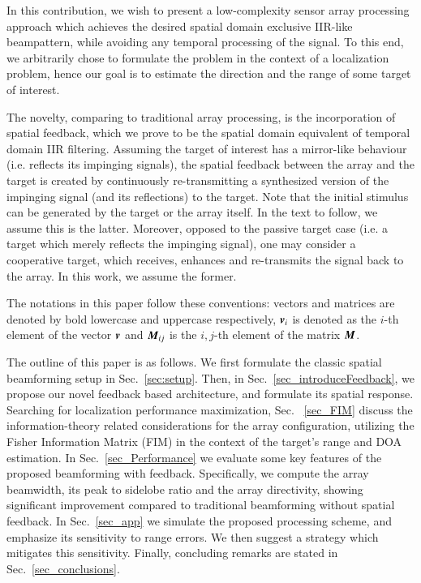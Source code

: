 \par In this contribution, we wish to present a low-complexity sensor array processing approach which achieves the desired spatial domain exclusive IIR-like beampattern, while avoiding any temporal processing of the signal.
To this end, we arbitrarily chose to formulate the problem in the context of a localization problem, hence our goal is to estimate the direction and the range of some target of interest. 
\par The novelty, comparing to traditional array processing, is the incorporation of spatial feedback, which we prove to be the spatial domain equivalent of temporal domain IIR filtering.
Assuming the target of interest has a mirror-like behaviour (i.e. reflects its impinging signals), the spatial feedback between the array and the target is created by continuously re-transmitting a synthesized version of the impinging signal (and its reflections) to the target.
Note that the initial stimulus can be generated by the target or the array itself. In the text to follow, we assume this is the latter. 
Moreover, opposed to the passive target case (i.e. a target which merely reflects the impinging signal), one may consider a cooperative target, which receives, enhances and re-transmits the signal back to the array. In this work, we assume the former.
\par The notations in this paper follow these conventions: vectors and matrices are denoted by bold lowercase and uppercase respectively, $\boldsymbol{v}_{i}$ is denoted as the $i$-th element of the vector $\boldsymbol{v}$ and $\boldsymbol{M}_{ij}$ is the $i,j$-th element of the matrix $\boldsymbol{M}$.
\par The outline of this paper is as follows. We first formulate the classic spatial beamforming setup in Sec.~\ref{sec:setup}. Then, in Sec.~\ref{sec_introduceFeedback}, we propose our novel feedback based architecture, and formulate its spatial response.
Searching for localization performance maximization, Sec.~ \ref{sec_FIM} discuss the information-theory related considerations for the array configuration, utilizing the Fisher Information Matrix (FIM) in the context of the target's range and DOA estimation.
In Sec.~\ref{sec_Performance} we evaluate some key features of the proposed beamforming with feedback. Specifically, we compute the array beamwidth, its peak to sidelobe ratio and the array directivity, showing significant improvement compared to traditional beamforming without spatial feedback. 
In Sec.~\ref{sec_app} we simulate the proposed processing scheme, and emphasize its sensitivity to range errors. We then suggest a strategy which mitigates this sensitivity. Finally, concluding remarks are stated in Sec.~\ref{sec_conclusions}.
